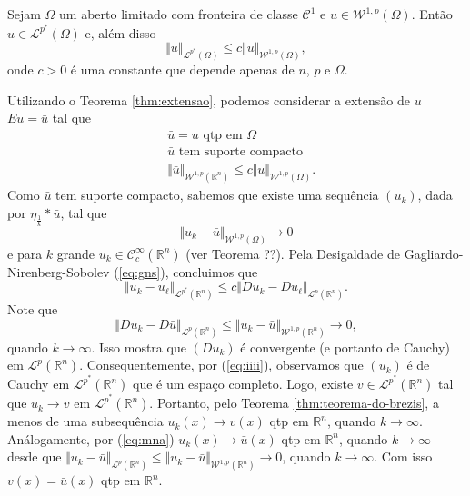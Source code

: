 \documentclass[a4paper, 11pt]{book}
\theoremstyle{definition}
\newcommand{\bR}{\mathbb{R}}
\newcommand{\cC}{\mathcal{C}}
\newcommand{\cL}{\mathcal{L}}
\newcommand{\cW}{\mathcal{W}}
\begin{document}
\begin{tbox} \label{thm:desigualdade-teorema-2}
    Sejam $\Omega$ um aberto limitado com fronteira de classe $\cC^1$ e $u \in \cW^{1,p}(\Omega)$. Então $u \in \cL^{p^*}(\Omega)$ e, além disso
    \[
        \Vert u \Vert_{\cL^{p^*}(\Omega)} \leqslant c \Vert u \Vert_{\cW^{1,p}(\Omega)},
    \]
    onde $c > 0$ é uma constante que depende apenas de $n$, $p$ e $\Omega$.
\end{tbox}
\begin{prf}
    Utilizando o Teorema \ref{thm:extensao}, podemos considerar a extensão de $u$ $Eu = \bar u$ tal que
    \begin{equation} \label{eq:man}
        \begin{aligned}
            &\bar u = u \text{ qtp em } \Omega\\
            &\bar u \text{ tem suporte compacto}\\
            &\Vert \bar u \Vert_{\cW^{1,p}(\bR^n)} \leqslant c\Vert u \Vert_{\cW^{1,p}(\Omega)}.
        \end{aligned}
    \end{equation}
    Como $\bar u$ tem suporte compacto, sabemos que existe uma sequência $(u_k)$, dada por $\eta_{\frac{1}{k}} * \bar u$, tal que
    \begin{equation} \label{eq:mna}
        \Vert u_k - \bar u \Vert_{\cW^{1,p}(\Omega)} \to 0
    \end{equation}
    e para $k$ grande $u_k \in \cC^{\infty}_c(\bR^n)$ (ver Teorema ??).
    Pela Desigaldade de Gagliardo-Nirenberg-Sobolev (\ref{eq:gns}), concluimos que
    \begin{equation} \label{eq:iiii}
        \Vert u_k - u_\ell \Vert_{\cL^{p^*}(\bR^n)} \leqslant c \Vert Du_k - Du_\ell \Vert_{\cL^p(\bR^n)}.
    \end{equation}
    Note que
    \[
        \Vert Du_k - D\bar u \Vert_{\cL^p(\bR^n)} \leqslant \Vert u_k - \bar u \Vert_{\cW^{1,p}(\bR^n)} \to 0,
    \]
    quando $k \to \infty$.
    Isso mostra que $(Du_k)$ é convergente (e portanto de Cauchy) em $\cL^p(\bR^n)$.
    Consequentemente, por (\ref{eq:iiii}), observamos que $(u_k)$ é de Cauchy em $\cL^{p^*}(\bR^n)$ que é um espaço completo. Logo, existe $v \in \cL^{p^*}(\bR^n)$ tal que $u_k \to v$ em $\cL^{p^*}(\bR^n)$. Portanto, pelo Teorema \ref{thm:teorema-do-brezis}, a menos de uma subsequência $u_k(x) \to v(x)$ qtp em $\bR^n$, quando $k \to \infty$. Análogamente, por (\ref{eq:mna}) $u_k(x) \to \bar u(x)$ qtp em $\bR^n$, quando $k \to \infty$ desde que $\Vert u_k - \bar u \Vert_{\cL^p(\bR^n)} \leqslant \Vert u_k - \bar u \Vert_{\cW^{1,p}(\bR^n)} \to 0$, quando $k \to \infty$. Com isso $v(x) = \bar u(x)$ qtp em $\bR^n$.

\end{prf}
\end{document}

